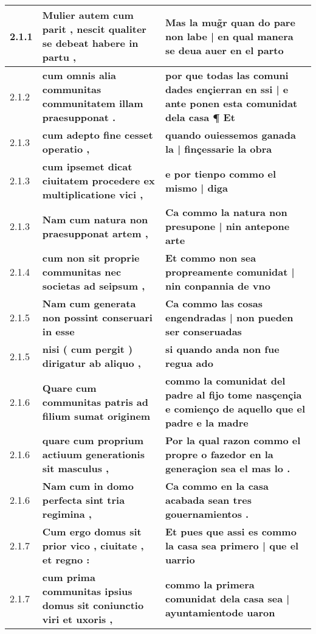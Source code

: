 \begin{tabular}{|p{1cm}|p{6.5cm}|p{6.5cm}|}
2.1.1 &  \textbf{ Mulier autem cum parit , nescit qualiter se debeat habere in partu , }  &  \textbf{ Mas la mug̃r quan do pare non labe | en qual manera se deua auer en el parto }  \\\hline
2.1.2 &  \textbf{ cum omnis alia communitas communitatem illam praesupponat . }  &  \textbf{ por que todas las comuni dades ençierran en ssi | e ante ponen esta comunidat dela casa ¶ Et }  \\\hline
2.1.3 &  \textbf{ cum adepto fine cesset operatio , }  &  \textbf{ quando ouiessemos ganada la | finçessarie la obra }  \\\hline
2.1.3 &  \textbf{ cum ipsemet dicat ciuitatem procedere ex multiplicatione vici , }  &  \textbf{ e por tienpo commo el mismo | diga }  \\\hline
2.1.3 &  \textbf{ Nam cum natura non praesupponat artem , }  &  \textbf{ Ca commo la natura non presupone | nin antepone arte }  \\\hline
2.1.4 &  \textbf{ cum non sit proprie communitas nec societas ad seipsum , }  &  \textbf{ Et commo non sea propreamente comunidat | nin conpannia de vno }  \\\hline
2.1.5 &  \textbf{ Nam cum generata non possint conseruari in esse }  &  \textbf{ Ca commo las cosas engendradas | non pueden ser conseruadas }  \\\hline
2.1.5 &  \textbf{ nisi ( cum pergit ) dirigatur ab aliquo , }  &  \textbf{ si quando anda non fue regua ado }  \\\hline
2.1.6 &  \textbf{ Quare cum communitas patris ad filium sumat originem }  &  \textbf{ commo la comunidat del padre al fijo tome nasçençia e comienço de aquello que el padre e la madre }  \\\hline
2.1.6 &  \textbf{ quare cum proprium actiuum generationis sit masculus , }  &  \textbf{ Por la qual razon commo el propre o fazedor en la generaçion sea el mas lo . }  \\\hline
2.1.6 &  \textbf{ Nam cum in domo perfecta sint tria regimina , }  &  \textbf{ Ca commo en la casa acabada sean tres gouernamientos . }  \\\hline
2.1.7 &  \textbf{ Cum ergo domus sit prior vico , ciuitate , et regno : }  &  \textbf{ Et pues que assi es commo la casa sea primero | que el uarrio }  \\\hline
2.1.7 &  \textbf{ cum prima communitas ipsius domus sit coniunctio viri et uxoris , }  &  \textbf{ commo la primera comunidat dela casa sea | ayuntamientode uaron }  \\\hline

\end{tabular}
